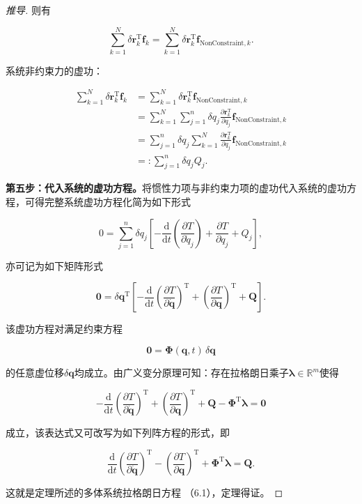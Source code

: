 \begin{proof}[推导]
则有

\[
\sum_{k=1}^{N}\delta\boldsymbol{r}_k^{\mathrm{T}}\boldsymbol{f}_k = \sum_{k=1}^{N}\delta\boldsymbol{r}_k^{\mathrm{T}}\boldsymbol{f}_{\text{NonConstraint},k}.
\]

系统非约束力的虚功：

\[
\begin{aligned}
\sum_{k=1}^{N}\delta\boldsymbol{r}_k^{\mathrm{T}}\boldsymbol{f}_k
&= \sum_{k=1}^{N}\delta\boldsymbol{r}_k^{\mathrm{T}}\boldsymbol{f}_{\text{NonConstraint},k} \\
&= \sum_{k=1}^{N}\sum_{j=1}^{n}\delta q_j \frac{\partial \boldsymbol{r}_k^{\mathrm{T}}}{\partial q_j}\boldsymbol{f}_{\text{NonConstraint},k} \\
&= \sum_{j=1}^{n}\delta q_j \sum_{k=1}^{N}\frac{\partial \boldsymbol{r}_k^{\mathrm{T}}}{\partial q_j}\boldsymbol{f}_{\text{NonConstraint},k} \\
&=: \sum_{j=1}^{n}\delta q_j Q_j.
\end{aligned}
\]

\textbf{第五步：代入系统的虚功方程。}将惯性力项与非约束力项的虚功代入系统的虚功方程，可得完整系统虚功方程化简为如下形式

\[
0 = \sum_{j=1}^{n}\delta q_j\left[-\frac{\mathrm{d}}{\mathrm{d}t}\left(\frac{\partial T}{\partial \dot{q}_j}\right) + \frac{\partial T}{\partial q_j} + Q_j\right],
\]

亦可记为如下矩阵形式

\[
\boldsymbol{0} = \delta\boldsymbol{q}^{\mathrm{T}}\left[-\frac{\mathrm{d}}{\mathrm{d}t}\left(\frac{\partial T}{\partial \dot{\boldsymbol{q}}}\right)^{\mathrm{T}} + \left(\frac{\partial T}{\partial \boldsymbol{q}}\right)^{\mathrm{T}} + \boldsymbol{Q}\right].
\]

该虚功方程对满足约束方程

\[
\boldsymbol{0} = \boldsymbol{\Phi}(\boldsymbol{q},t)\,\delta\boldsymbol{q}
\]

的任意虚位移$\delta\boldsymbol{q}$均成立。由广义变分原理可知：存在拉格朗日乘子$\boldsymbol{\lambda}\in\mathbb{R}^m$使得

\[
-\frac{\mathrm{d}}{\mathrm{d}t}\left(\frac{\partial T}{\partial \dot{\boldsymbol{q}}}\right)^{\mathrm{T}} + \left(\frac{\partial T}{\partial \boldsymbol{q}}\right)^{\mathrm{T}} + \boldsymbol{Q} - \boldsymbol{\Phi}^{\mathrm{T}}\boldsymbol{\lambda} = \boldsymbol{0}
\]

成立，该表达式又可改写为如下列阵方程的形式，即

\[
\frac{\mathrm{d}}{\mathrm{d}t}\left(\frac{\partial T}{\partial \dot{\boldsymbol{q}}}\right)^{\mathrm{T}} - \left(\frac{\partial T}{\partial \boldsymbol{q}}\right)^{\mathrm{T}} + \boldsymbol{\Phi}^{\mathrm{T}}\boldsymbol{\lambda} = \boldsymbol{Q}.
\]

这就是定理所述的多体系统拉格朗日方程 （6.1），定理得证。
\end{proof}
